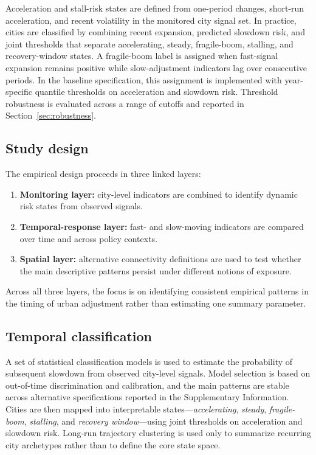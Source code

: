 \documentclass[oneside,pdflatex,sn-nature]{sn-jnl}
\begin{document}
Acceleration and stall-risk states are defined from one-period changes, short-run acceleration, and recent volatility in the monitored city signal set. In practice, cities are classified by combining recent expansion, predicted slowdown risk, and joint thresholds that separate accelerating, steady, fragile-boom, stalling, and recovery-window states. A fragile-boom label is assigned when fast-signal expansion remains positive while slow-adjustment indicators lag over consecutive periods. In the baseline specification, this assignment is implemented with year-specific quantile thresholds on acceleration and slowdown risk. Threshold robustness is evaluated across a range of cutoffs and reported in Section~\ref{sec:robustness}.

\subsection{Study design}
The empirical design proceeds in three linked layers:
\begin{enumerate}[label=\arabic*.]
  \item \textbf{Monitoring layer:} city-level indicators are combined to identify dynamic risk states from observed signals.
  \item \textbf{Temporal-response layer:} fast- and slow-moving indicators are compared over time and across policy contexts.
  \item \textbf{Spatial layer:} alternative connectivity definitions are used to test whether the main descriptive patterns persist under different notions of exposure.
\end{enumerate}
Across all three layers, the focus is on identifying consistent empirical patterns in the timing of urban adjustment rather than estimating one summary parameter.

\subsection{Temporal classification}
A set of statistical classification models is used to estimate the probability of subsequent slowdown from observed city-level signals.\cite{mullainathan2017machine,athey2019machine,guo2017calibration} Model selection is based on out-of-time discrimination and calibration, and the main patterns are stable across alternative specifications reported in the Supplementary Information. Cities are then mapped into interpretable states---\emph{accelerating}, \emph{steady}, \emph{fragile-boom}, \emph{stalling}, and \emph{recovery window}---using joint thresholds on acceleration and slowdown risk. Long-run trajectory clustering is used only to summarize recurring city archetypes rather than to define the core state space.
\end{document}
